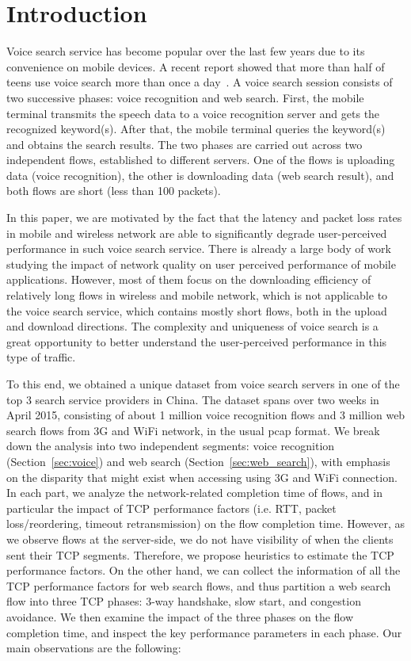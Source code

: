 
\section{Introduction}
\label{sec:intro}

Voice search service has become popular over the last few years due to its convenience on mobile devices. A recent report showed that more than half of teens use voice search more than once a day~\cite{voice_search_report}. A voice search session consists of two successive phases: voice recognition and web search. First, the mobile terminal transmits the speech data to a voice recognition server and gets the recognized keyword(s). After that, the mobile terminal queries the keyword(s) and obtains the search results. The two phases are carried out across two independent flows, established to different servers. One of the flows is uploading data (voice recognition), the other is downloading data (web search result), and both flows are short (less than 100 packets).

In this paper, we are motivated by the fact that the latency and packet loss rates in mobile and wireless network are able to significantly degrade user-perceived performance in such voice search service. There is already a large body of work \cite{sommers2012cell,yu2014can,chen2012network} studying the impact of network quality on user perceived performance of mobile applications. However, most of them focus on the downloading efficiency of relatively long flows in wireless and mobile network, which is not applicable to the voice search service, which contains mostly short flows, both in the upload and download directions. The complexity and uniqueness of voice search is a great opportunity to better understand the user-perceived performance in this type of traffic.

To this end, we obtained a unique dataset from voice search servers in one of the top 3 search service providers in China. The dataset spans over two weeks in April 2015, consisting of about 1 million voice recognition flows and 3 million web search flows from 3G and WiFi network, in the usual pcap format. We break down the analysis into two independent segments: voice recognition (Section~\ref{sec:voice}) and web search (Section~\ref{sec:web_search}), with emphasis on the disparity that might exist when accessing using 3G and WiFi connection. In each part, we analyze the network-related completion time of flows, and in particular the impact of TCP performance factors (i.e. RTT, packet loss/reordering, timeout retransmission) on the flow completion time. However, as we observe flows at the server-side, we do not have visibility of when the clients sent their TCP segments. Therefore, we propose heuristics to estimate the TCP performance factors. On the other hand, we can collect the information of all the TCP performance factors for web search flows, and thus partition a web search flow into three TCP phases: 3-way handshake, slow start, and congestion avoidance. We then examine the impact of the three phases on the flow completion time, and inspect the key performance parameters in each phase. Our main observations are the following:

